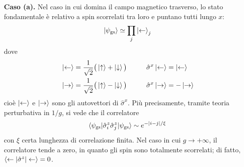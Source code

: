 \documentclass[11pt, a4paper]{scrartcl}
\theoremstyle{style}
\theoremstyle{style1}
\numberwithin{equation}{subsection}
\begin{document}
\textbf{Caso (a).} Nel caso in cui domina il campo magnetico trasverso, lo stato fondamentale \`e relativo a spin scorrelati tra loro e puntano tutti lungo $x$:
\[
\ket{\psi _\text{gs}} \simeq \prod_j \ket{\leftarrow} _j
\] 
dove
\[
	\begin{split}
		&\ket{\leftarrow} = \frac{1}{\sqrt{2} }\big(\ket{\uparrow} +\ket{\downarrow} \big)\hspace{1cm}\hat{\sigma }^x \ket{\leftarrow} = \ket{\leftarrow} \\
		&\ket{\rightarrow} = \frac{1}{\sqrt{2} }\big(\ket{\uparrow} -\ket{\downarrow} \big)\hspace{1cm}\hat{\sigma }^x \ket{\rightarrow} = -\ket{\rightarrow}
	\end{split}
\] 
cio\`e $\ket{\leftarrow} $ e $\ket{\rightarrow} $ sono gli autovettori di $\hat{\sigma }^x$.
Pi\`u precisamente, tramite teoria perturbativa in $1 / g$, si vede che il correlatore
\[
\braket{\psi _\text{gs}|\hat{\sigma }^z_i \hat{\sigma }^z_j|\psi _\text{gs}} \sim e^{- \lvert i-j \rvert / \xi }
\] 
con $\xi $ certa lunghezza di correlazione finita.
Nel caso in cui $g\to +\infty$, il correlatore tende a zero, in quanto gli spin sono totalmente scorrelati; di fatto, $\braket{\leftarrow|\hat{\sigma }^z|\leftarrow}  =0$.
\vspace{.5cm}
\end{document}
